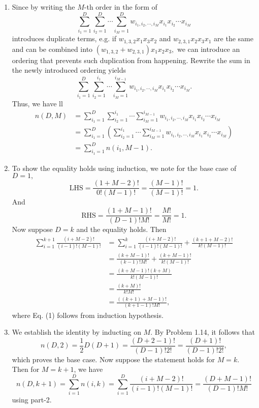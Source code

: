 \begin{enumerate}[leftmargin={*}]
\item Since by writing the $M$-th order in the form of 
\[
\sum_{i_{1}=1}^{D}\sum_{i_{2}=1}^{D}\cdots\sum_{i_{M}=1}^{D}w_{i_{1},i_{2},\cdots,i_{M}}x_{i_{1}}x_{i_{2}}\cdots x_{i_{M}}
\]
introduces duplicate terms, e.g. if $w_{1,3,2}x_{1}x_{3}x_{2}$ and
$w_{2,3,1}x_{2}x_{3}x_{1}$ are the same and can be combined into
$(w_{1,3,2}+w_{2,3,1})x_{1}x_{2}x_{3},$ we can introduce an ordering
that prevents such duplication from happening. Rewrite the sum in
the newly introduced ordering yields 
\[
\sum_{i_{1}=1}^{D}\sum_{i_{2}=1}^{i_{1}}\cdots\sum_{i_{M}=1}^{i_{M-1}}w_{i_{1},i_{2},\cdots,i_{M}}x_{i_{1}}x_{i_{2}}\cdots x_{i_{M}}.
\]
Thus, we have ll
\begin{align*}
n(D,M) & =\sum_{i_{1}=1}^{D}\sum_{i_{2}=1}^{i_{1}}\cdots\sum_{i_{M}=1}^{i_{M-1}}w_{i_{1},i_{2},\cdots,i_{M}}x_{i_{1}}x_{i_{2}}\cdots x_{i_{M}}\\
 & =\sum_{i_{1}=1}^{D}\left(\sum_{i_{2}=1}^{i_{1}}\cdots\sum_{i_{M}=1}^{i_{M-1}}w_{i_{1},i_{2},\cdots,i_{M}}x_{i_{1}}x_{i_{2}}\cdots x_{i_{M}}\right)\\
 & =\sum_{i_{1}=1}^{D}n(i_{1},M-1).
\end{align*}
\item To show the equality holds using induction, we note for the base case
of $D=1,$ 
\[
\text{LHS}=\frac{(1+M-2)!}{0!(M-1)!}=\frac{(M-1)!}{(M-1)!}=1.
\]
And 
\[
\text{RHS}=\frac{(1+M-1)!}{(D-1)!M!}=\frac{M!}{M!}=1.
\]
Now suppose $D=k$ and the equality holds. Then 
\begin{align*}
\sum_{i=1}^{k+1}\frac{(i+M-2)!}{(i-1)!(M-1)!} & =\sum_{i=1}^{k}\frac{(i+M-2)!}{(i-1)!(M-1)!}+\frac{(k+1+M-2)!}{k!(M-1)!}\\
 & =\frac{(k+M-1)!}{(k-1)!M!}+\frac{(k+M-1)!}{k!(M-1)!}\tag{1}\\
 & =\frac{(k+M-1)!(k+M)}{k!(M-1)!}\\
 & =\frac{(k+M)!}{k!M!}\\
 & =\frac{((k+1)+M-1)!}{(k+1-1)!M!},
\end{align*}
where Eq. (1) follows from induction hypothesis. 
\item We establish the identity by inducting on $M$. By Problem 1.14, it
follows that 
\[
n(D,2)=\frac{1}{2}D(D+1)=\frac{(D+2-1)!}{(D-1)!2!}=\frac{(D+1)!}{(D-1)!2!},
\]
which proves the base case. Now suppose the statement holds for $M=k$.
Then for $M=k+1$, we have 
\[
n(D,k+1)=\sum_{i=1}^{D}n(i,k)=\sum_{i=1}^{D}\frac{(i+M-2)!}{(i-1)!(M-1)!}=\frac{(D+M-1)!}{(D-1)!M!}
\]
using part-2. 
\end{enumerate}
